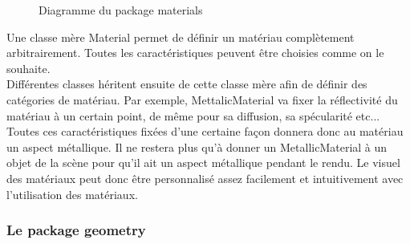 \documentclass[11pt]{article}
\begin{document}
\begin{figure}[h!]
	
	\caption{Diagramme du package materials}
	\label{diagrammePackageMaterials}
\end{figure}
\FloatBarrier

Une classe mère Material permet de définir un matériau complètement arbitrairement. Toutes les caractéristiques peuvent être choisies comme on le souhaite.\\
Différentes classes héritent ensuite de cette classe mère afin de définir des catégories de matériau. Par exemple, MettalicMaterial va fixer la réflectivité du matériau à un certain point, de même pour sa diffusion, sa spécularité etc... Toutes ces caractéristiques fixées d'une certaine façon donnera donc au matériau un aspect métallique. Il ne restera plus qu'à donner un MetallicMaterial à un objet de la scène pour qu'il ait un aspect métallique pendant le rendu. Le visuel des matériaux peut donc être personnalisé assez facilement et intuitivement avec l'utilisation des matériaux.

\subsubsection{Le package geometry}
\end{document}

